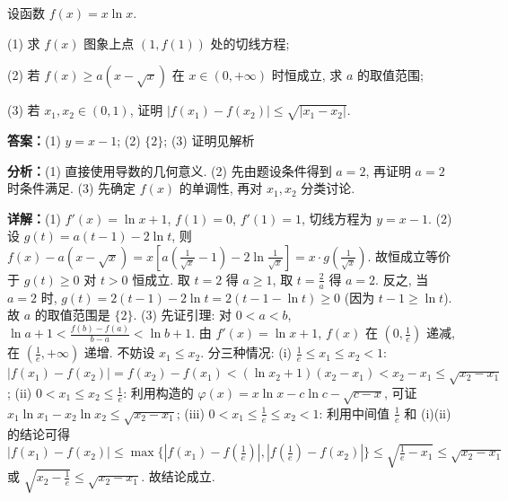 \begin{question}[points=16]
设函数 $f(x)=x\ln x$.

(1) 求 $f(x)$ 图象上点 $(1,f(1))$ 处的切线方程;

(2) 若 $f(x)\geq a(x-\sqrt{x})$ 在 $x\in(0,+\infty)$ 时恒成立, 求 $a$ 的取值范围;

(3) 若 $x_1,x_2\in(0,1)$, 证明 $|f(x_1)-f(x_2)|\leq \sqrt{|x_1-x_2|}$.
\begin{solution}
\textbf{答案：}(1) $y=x-1$; (2) $\{2\}$; (3) 证明见解析

\textbf{分析：}(1) 直接使用导数的几何意义. (2) 先由题设条件得到 $a=2$, 再证明 $a=2$ 时条件满足. (3) 先确定 $f(x)$ 的单调性, 再对 $x_1,x_2$ 分类讨论.

\textbf{详解：}(1) $f'(x)=\ln x+1$, $f(1)=0$, $f'(1)=1$, 切线方程为 $y=x-1$.
(2) 设 $g(t)=a(t-1)-2\ln t$, 则 $f(x)-a(x-\sqrt{x})=x\left[a\left(\frac{1}{\sqrt{x}}-1\right)-2\ln\frac{1}{\sqrt{x}}\right]=x\cdot g\left(\frac{1}{\sqrt{x}}\right)$. 故恒成立等价于 $g(t)\geq 0$ 对 $t>0$ 恒成立. 取 $t=2$ 得 $a\geq 1$, 取 $t=\frac{2}{a}$ 得 $a=2$. 反之, 当 $a=2$ 时, $g(t)=2(t-1)-2\ln t=2(t-1-\ln t)\geq 0$ (因为 $t-1\geq\ln t$). 故 $a$ 的取值范围是 $\{2\}$.
(3) 先证引理: 对 $0<a<b$, $\ln a+1<\frac{f(b)-f(a)}{b-a}<\ln b+1$. 由 $f'(x)=\ln x+1$, $f(x)$ 在 $(0,\frac{1}{e})$ 递减, 在 $(\frac{1}{e},+\infty)$ 递增. 不妨设 $x_1\leq x_2$. 分三种情况: (i) $\frac{1}{e}\leq x_1\leq x_2<1$: $|f(x_1)-f(x_2)|=f(x_2)-f(x_1)<(\ln x_2+1)(x_2-x_1)<x_2-x_1\leq \sqrt{x_2-x_1}$; (ii) $0<x_1\leq x_2\leq \frac{1}{e}$: 利用构造的 $\varphi(x)=x\ln x - c\ln c - \sqrt{c-x}$, 可证 $x_1\ln x_1 - x_2\ln x_2 \leq \sqrt{x_2-x_1}$; (iii) $0<x_1\leq \frac{1}{e}\leq x_2<1$: 利用中间值 $\frac{1}{e}$ 和 (i)(ii) 的结论可得 $|f(x_1)-f(x_2)|\leq \max\{|f(x_1)-f(\frac{1}{e})|, |f(\frac{1}{e})-f(x_2)|\}\leq \sqrt{\frac{1}{e}-x_1}\leq \sqrt{x_2-x_1}$ 或 $\sqrt{x_2-\frac{1}{e}}\leq \sqrt{x_2-x_1}$. 故结论成立.
\end{solution}
\end{question}

